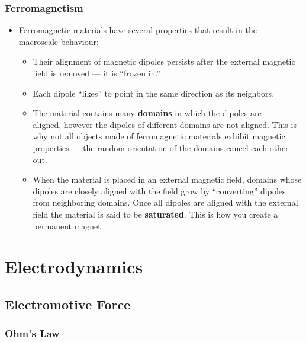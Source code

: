 \documentclass{article}
\begin{document}
\subsubsection{Ferromagnetism}

\begin{itemize}
  \item Ferromagnetic materials have several properties that result in the \\ macroscale behaviour:

        \begin{itemize}
          \item Their alignment of magnetic dipoles persists after the external magnetic field is removed — it is ``frozen in.''

          \item Each dipole ``likes'' to point in the same direction as its neighbors.

          \item The material contains many \textbf{domains} in which the dipoles are \\ aligned, however the dipoles of different domains are not aligned. This is why not all objects made of ferromagnetic materials exhibit magnetic properties — the random orientation of the domains cancel each other out.

          \item When the material is placed in an external magnetic field, domains whose dipoles are closely aligned with the field grow by ``converting'' dipoles from neighboring domains. Once all dipoles are aligned with the external field the material is said to be \textbf{saturated}. This is how you create a permanent magnet.
        \end{itemize}
\end{itemize}

\section{Electrodynamics}

\subsection{Electromotive Force}

\subsubsection{Ohm's Law}
\end{document}
